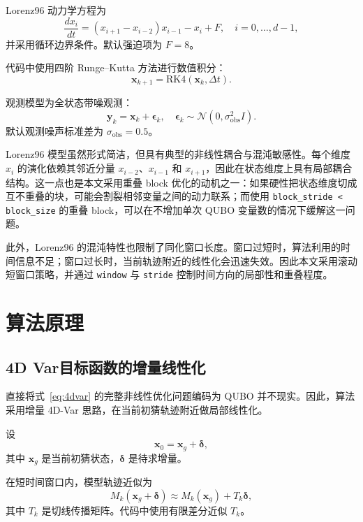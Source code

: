 \documentclass[UTF8,a4paper,12pt]{ctexart}
\begin{document}
Lorenz96 动力学方程为
\begin{equation}
  \frac{d x_i}{dt}
  =
  \left(x_{i+1} - x_{i-2}\right)x_{i-1}
  - x_i + F,
  \quad i = 0,\ldots,d-1,
\end{equation}
并采用循环边界条件。默认强迫项为 $F=8$。

代码中使用四阶 Runge--Kutta 方法进行数值积分：
\begin{equation}
  \bm{x}_{k+1} = \mathrm{RK4}(\bm{x}_k, \Delta t).
\end{equation}

观测模型为全状态带噪观测：
\begin{equation}
  \bm{y}_k = \bm{x}_k + \bm{\epsilon}_k,
  \quad
  \bm{\epsilon}_k \sim \mathcal{N}(0, \sigma_{\mathrm{obs}}^2 I).
\end{equation}
默认观测噪声标准差为 $\sigma_{\mathrm{obs}} = 0.5$。

Lorenz96 模型虽然形式简洁，但具有典型的非线性耦合与混沌敏感性。每个维度 $x_i$ 的演化依赖其邻近分量 $x_{i-2}$、$x_{i-1}$ 和 $x_{i+1}$，因此在状态维度上具有局部耦合结构。这一点也是本文采用重叠 block 优化的动机之一：如果硬性把状态维度切成互不重叠的块，可能会割裂相邻变量之间的动力联系；而使用 \texttt{block\_stride < block\_size} 的重叠 block，可以在不增加单次 QUBO 变量数的情况下缓解这一问题。

此外，Lorenz96 的混沌特性也限制了同化窗口长度。窗口过短时，算法利用的时间信息不足；窗口过长时，当前轨迹附近的线性化会迅速失效。因此本文采用滚动短窗口策略，并通过 \texttt{window} 与 \texttt{stride} 控制时间方向的局部性和重叠程度。


\section{算法原理}
\subsection{4D Var目标函数的增量线性化}

直接将式~\eqref{eq:4dvar} 的完整非线性优化问题编码为 QUBO 并不现实。因此，算法采用增量 4D-Var 思路，在当前初猜轨迹附近做局部线性化。

设
\begin{equation}
  \bm{x}_0 = \bm{x}_g + \bm{\delta},
\end{equation}
其中 $\bm{x}_g$ 是当前初猜状态，$\bm{\delta}$ 是待求增量。

在短时间窗口内，模型轨迹近似为
\begin{equation}
  M_k(\bm{x}_g + \bm{\delta})
  \approx
  M_k(\bm{x}_g) + T_k \bm{\delta},
\end{equation}
其中 $T_k$ 是切线传播矩阵。代码中使用有限差分近似 $T_k$。
\end{document}
